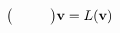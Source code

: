 \documentclass[preview]{standalone}
\begin{document}
\begin{align*}
\big( \hphantom{u_x} \;\; \hphantom{u_y} \big) \mathbf{v} = L ( \mathbf{v} )
\end{align*}
\end{document}
